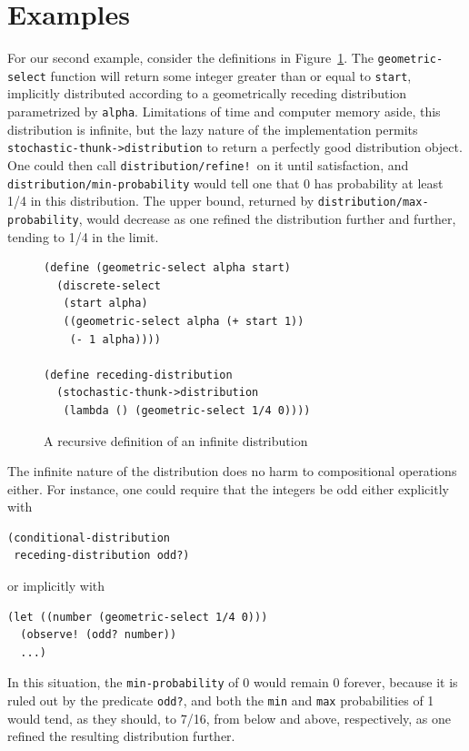 \documentclass[10pt]{sigplanconf}
\newcommand{\code}[1]{\texttt{#1}}
\begin{document}
\section{Examples}
\label{examples}

For our second example, consider the definitions in
Figure~\ref{geometric}.  The \code{geometric-select} function will
return some integer greater than or equal to \code{start}, implicitly
distributed according to a geometrically receding distribution
parametrized by \code{alpha}.  Limitations of time and computer memory
aside, this distribution is infinite, but the lazy nature of the
implementation permits 
\code{stochastic-thunk->distribution} to return a perfectly good
distribution object.  One could then call \code{distribution/refine!}\
on it until satisfaction, and \code{distribution/min-probability}
would tell one that 0 has probability at least 1/4 in this
distribution.  The upper bound, returned by
\code{distribution/max-probability}, would decrease as one refined the
distribution further and further, tending to 1/4 in the limit.

\begin{figure}[tbhp]
\begin{verbatim}
(define (geometric-select alpha start)
  (discrete-select
   (start alpha)
   ((geometric-select alpha (+ start 1))
    (- 1 alpha))))

(define receding-distribution
  (stochastic-thunk->distribution
   (lambda () (geometric-select 1/4 0))))
\end{verbatim}
\caption{A recursive definition of an infinite distribution}
\label{geometric}
\end{figure}

The infinite nature of the distribution does no harm to compositional
operations either.  For instance, one could require that the 
integers be odd either explicitly with
\begin{verbatim}
(conditional-distribution
 receding-distribution odd?)
\end{verbatim}
or implicitly with 
\begin{verbatim}
(let ((number (geometric-select 1/4 0)))
  (observe! (odd? number))
  ...)
\end{verbatim}
In this situation, the \code{min-probability} of 0 would remain 0
forever, because it is ruled out by the predicate \code{odd?}, and
both the \code{min} and \code{max} probabilities of 1 would tend, as
they should, to 7/16, from below and above, respectively, as one
refined the resulting distribution further.
\end{document}
